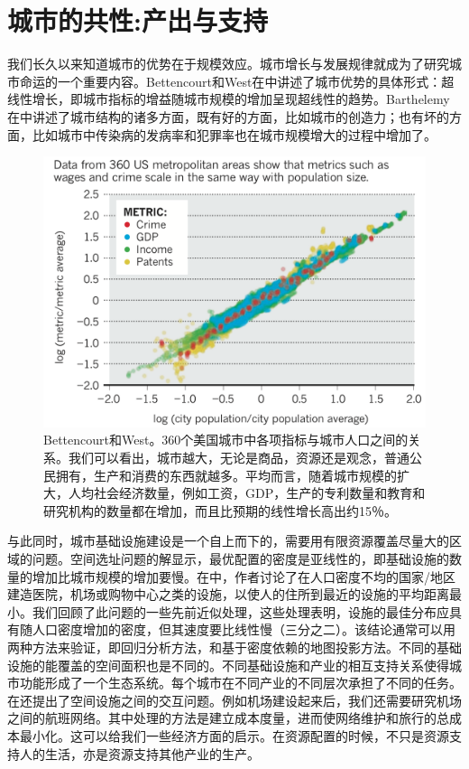 \chapter{城市的共性:产出与支持}

我们长久以来知道城市的优势在于规模效应。城市增长与发展规律就成为了研究城市命运的一个重要内容\cite{thisse2010toward}。Bettencourt和West在\cite{bettencourt2010unified}中讲述了城市优势的具体形式：超线性增长，即城市指标的增益随城市规模的增加呈现超线性的趋势。Barthelemy在\cite{Barthelemy2019}中讲述了城市结构的诸多方面，既有好的方面，比如城市的创造力\cite{Arbesman2009}；也有坏的方面，比如城市中传染病的发病率\cite{PhysRevE.94.052316}和犯罪率\cite{banerjee2015competitive}也在城市规模增大的过程中增加了。

\begin{figure}
  \centering
  \includegraphics[width = \linewidth]{pictures/scaling.png}
  \caption{Bettencourt和West\cite{bettencourt2010unified}。360个美国城市中各项指标与城市人口之间的关系。我们可以看出，城市越大，无论是商品，资源还是观念，普通公民拥有，生产和消费的东西就越多。平均而言，随着城市规模的扩大，人均社会经济数量，例如工资，GDP，生产的专利数量和教育和研究机构的数量都在增加，而且比预期的线性增长高出约15％。}
\end{figure}

与此同时，城市基础设施建设是一个自上而下的，需要用有限资源覆盖尽量大的区域的问题\cite{PhysRevE.90.022803,PhysRevE.74.016117}。空间选址问题的解显示，最优配置的密度是亚线性的，即基础设施的数量的增加比城市规模的增加要慢。在\cite{PhysRevE.74.016117}中，作者讨论了在人口密度不均的国家/地区建造医院，机场或购物中心之类的设施，以使人的住所到最近的设施的平均距离最小。我们回顾了此问题的一些先前近似处理，这些处理表明，设施的最佳分布应具有随人口密度增加的密度，但其速度要比线性慢（三分之二）。该结论通常可以用两种方法来验证，即回归分析方法，和基于密度依赖的地图投影方法。不同的基础设施的能覆盖的空间面积也是不同的。不同基础设施和产业的相互支持关系使得城市功能形成了一个生态系统。每个城市在不同产业的不同层次承担了不同的任务\cite{camagni1993city,christopherson1986city}。在\cite{PhysRevE.74.016117}还提出了空间设施之间的交互问题。例如机场建设起来后，我们还需要研究机场之间的航班网络。其中处理的方法是建立成本度量，进而使网络维护和旅行的总成本最小化。这可以给我们一些经济方面的启示。在资源配置的时候，不只是资源支持人的生活，亦是资源支持其他产业的生产。

